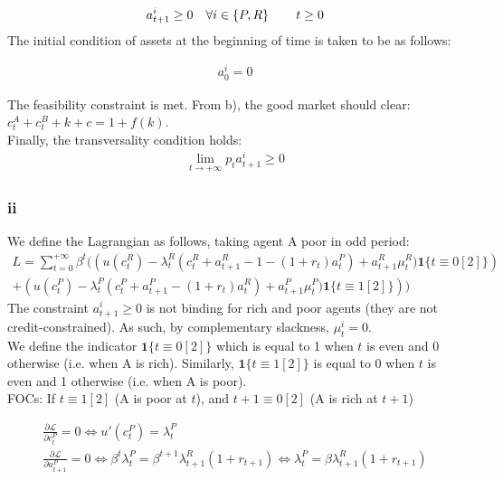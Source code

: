 \documentclass{article}
\begin{document}
\begin{gather*}
    a_{t+1}^i\geq0\quad\forall i\in\{P,R\} \mbox{\hspace{0.3in}} t \geq 0 \\
\end{gather*}
The initial condition of assets at the beginning of time is taken to be as follows:

\begin{gather*}
    a^i_{0} = 0
\end{gather*}

The feasibility constraint is met. From b), the good market should clear: \\ 
$c_t^A+c_t^B+k+c=1+f(k)$. \\
Finally, the transversality condition holds:
\begin{gather*}
    \lim_{t\rightarrow +\infty} p_ta_{t+1}^i \geq 0
\end{gather*}


\subsubsection{ii}
We define the Lagrangian as follows, taking agent A poor in odd period:
\begin{gather*}
    L=\sum_{t=0}^{+\infty}\beta^t ( \left( u(c_t^R)-\lambda_t^R(c_t^R+a^R_{t+1}-1-(1+r_t)a_t^P)+a_{t+1}^R\mu^R_{t})\mathbf{1}\{t\equiv0[2]\}\right)\\
    +\left( u(c_t^P)-\lambda_t^P(c_t^P+a_{t+1}^P-(1+r_t)a_t^R)+a_{t+1}^P\mu^P_{t})\mathbf{1}\{t\equiv1[2]\}\right) )
\end{gather*}
The constraint $a_{t+1}^i \geq 0$ is not binding for rich and poor agents (they are not credit-constrained). As such, by complementary slackness, $\mu^i_{t}=0$.\\
We define the indicator $\mathbf{1}\{t\equiv0[2]\}$ which is equal to 1 when $t$ is even and 0 otherwise (i.e. when A is rich). Similarly, $\mathbf{1}\{t\equiv1[2]\}$ is equal to 0 when $t$ is even and 1 otherwise (i.e. when A is poor).\\

FOCs: If $t\equiv1[2]$ (A is poor at $t$), and $t+1\equiv0[2]$ (A is rich at $t+1$)

\begin{gather*}
    \frac{\partial \mathcal{L}}{\partial c_t^P}=0\Leftrightarrow u'(c_t^P)=\lambda_t^P \\
    \frac{\partial \mathcal{L}}{\partial a_{t+1}^P}=0\Leftrightarrow \beta^t\lambda_{t}^P=\beta^{t+1}\lambda_{t+1}^R(1+r_{t+1})\Leftrightarrow \lambda_{t}^P=\beta\lambda_{t+1}^R(1+r_{t+1})
\end{gather*}
\end{document}
